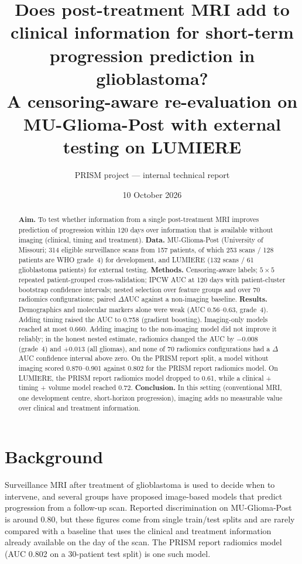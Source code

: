 \documentclass[11pt,a4paper]{article}
\title{Does post-treatment MRI add to clinical information for short-term progression prediction in glioblastoma?\\[0.3em]
\large A censoring-aware re-evaluation on MU-Glioma-Post with external testing on LUMIERE}
\author{PRISM project --- internal technical report}
\date{10 October 2026}
\begin{document}
\maketitle

\begin{abstract}
\noindent\textbf{Aim.} To test whether information from a single post-treatment MRI improves prediction of progression
within 120 days over information that is available without imaging (clinical, timing and treatment).
\textbf{Data.} MU-Glioma-Post (University of Missouri; 314 eligible surveillance scans from 157 patients, of which
253 scans / 128 patients are WHO grade~4) for development, and LUMIERE (132 scans / 61 glioblastoma patients) for
external testing.
\textbf{Methods.} Censoring-aware labels; $5\times5$ repeated patient-grouped cross-validation; IPCW AUC at 120 days with
patient-cluster bootstrap confidence intervals; nested selection over feature groups and over 70 radiomics
configurations; paired $\Delta$AUC against a non-imaging baseline.
\textbf{Results.} Demographics and molecular markers alone were weak (AUC 0.56--0.63, grade~4). Adding timing raised
the AUC to 0.758 (gradient boosting). Imaging-only models reached at most 0.660. Adding imaging to the non-imaging
model did not improve it reliably; in the honest nested estimate, radiomics changed the AUC by $-0.008$ (grade~4) and
$+0.013$ (all gliomas), and none of 70 radiomics configurations had a $\Delta$AUC confidence interval above zero.
On the PRISM report split, a model without imaging scored 0.870--0.901 against 0.802 for the PRISM report radiomics
model. On LUMIERE, the PRISM report radiomics model dropped to 0.61, while a clinical + timing + volume model reached
0.72.
\textbf{Conclusion.} In this setting (conventional MRI, one development centre, short-horizon progression), imaging adds
no measurable value over clinical and treatment information.
\end{abstract}

\section{Background}
Surveillance MRI after treatment of glioblastoma is used to decide when to intervene, and several groups have proposed
image-based models that predict progression from a follow-up scan. Reported discrimination on MU-Glioma-Post is
around 0.80, but these figures come from single train/test splits and are rarely compared with a baseline that uses the
clinical and treatment information already available on the day of the scan. The PRISM report radiomics model
(AUC 0.802 on a 30-patient test split) is one such model.
\end{document}
